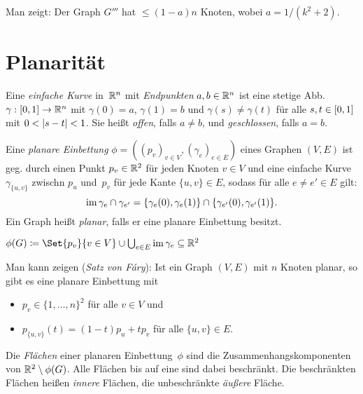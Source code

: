 \documentclass{cheat-sheet}
\newcommand{\Youtube}[1]{\href{https://www.youtube.com/watch?v=#1}{\textcolor{YoutubeColor}{$\blacktriangleright$}}}
\begin{document}
\begin{bem}
  Man zeigt: Der Graph $G'''$ hat $\leq (1-a) n$ Knoten, wobei $a = 1 / (k^2 + 2)$.
\end{bem}

\section{Planarität}


\begin{defn}
  Eine \emph{einfache Kurve} in~$\mathbb{R}^n$ mit \textit{Endpunkten} $a, b \in \mathbb{R}^n$ ist eine stetige Abb. $\gamma : \left[ 0, 1 \right] \to \mathbb{R}^n$ mit $\gamma(0) = a$, $\gamma(1) = b$ und $\gamma(s) \neq \gamma(t)$ für alle $s, t \in \left[ 0, 1 \right]$ mit $0 < \lvert s - t\rvert < 1$.
  Sie heißt \emph{offen}, falls $a \neq b$, und \emph{geschlossen}, falls $a = b$.
\end{defn}

\begin{defn}[\Youtube{wnYtITkWAYA}]
  Eine \emph{planare Einbettung} $\phi = ((p_v)_{v \in V}, (\gamma_e)_{e \in E})$ eines Graphen $(V, E)$ ist geg. durch einen Punkt $p_v \in \mathbb{R}^2$ für jeden Knoten $v \in V$ und eine einfache Kurve $\gamma_{\{ u, v \}}$ zwischn $p_u$ und~$p_v$ für jede Kante $\{ u, v \} \in E$, sodass für alle $e \neq e' \in E$ gilt:
  \[
    \operatorname{im} \gamma_e \cap \gamma_{e'} = \{ \gamma_e(0), \gamma_e(1) \} \cap \{ \gamma_{e'}(0), \gamma_{e'}(1) \}.
  \]
  Ein Graph heißt \emph{planar}, falls er eine planare Einbettung besitzt.
\end{defn}

\begin{nota}
  $\phi(G) \coloneqq \Set{p_v}{v \in V} \cup {\bigcup}_{e \in E} \im \gamma_e \subseteq \R^2$
\end{nota}

\begin{bem}
  Man kann zeigen (\textit{Satz von Fáry}): Ist ein Graph $(V, E)$ mit $n$ Knoten planar, so gibt es eine planare Einbettung mit
  \begin{itemize}
    \item $p_v \in \{1, \ldots, n\}^2$ für alle $v \in V$ und
    \item $p_{\{u, v\}}(t) = (1-t) p_u + t p_v$ für alle $\{u, v\} \in E$.
  \end{itemize}
\end{bem}

\begin{defn}
  Die \emph{Flächen} einer planaren Einbettung~$\phi$ sind die Zusammenhangskomponenten von $\mathbb{R}^2 \setminus \phi(G)$.
  Alle Flächen bis auf eine sind dabei beschränkt.
  Die beschränkten Flächen heißen \textit{innere} Flächen, die unbeschränkte \textit{äußere} Fläche.
\end{defn}
\end{document}
